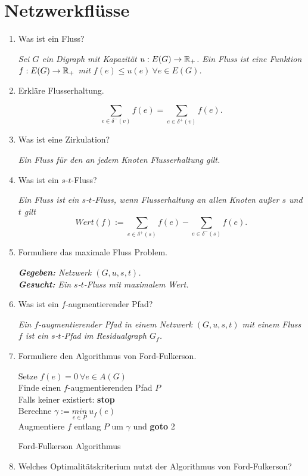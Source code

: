 \documentclass[a4paper,10pt]{scrreprt}
\begin{document}
	\section{Netzwerkflüsse}
	\begin{enumerate}
		\item Was ist ein Fluss?
		
		\textit{Sei $G$ ein Digraph mit Kapazität $u:E(G)\to \mathbb{R}_+$. Ein Fluss ist eine Funktion $f: E(G) \to \mathbb{R}_+$ mit $f(e)\le u(e)~\forall e\in E(G)$.}
		\item Erkläre Flusserhaltung.
		
		\textit{ \[\sum_{e\in \delta^-(v)} f(e) = \sum_{e\in \delta^+(v)} f(e).\]}
		\item Was ist eine Zirkulation?
		
		\textit{Ein Fluss für den an jedem Knoten Flusserhaltung gilt.}
		\item Was ist ein $s$-$t$-Fluss?
		
		\textit{Ein Fluss ist ein $s$-$t$-Fluss, wenn Flusserhaltung an allen Knoten außer $s$ und $t$ gilt
			\[Wert(f) :=\sum_{e\in \delta^+(s)} f(e) - \sum_{e\in \delta^-(s)} f(e).\]}
		\item Formuliere das maximale Fluss Problem.
		
		\textit{\hspace*{10pt}\textbf{Gegeben: }Netzwerk $(G, u, s, t)$.\\[5pt]
			\hspace*{10pt}\textbf{Gesucht: }Ein $s$-$t$-Fluss mit maximalem Wert.}
		\item Was ist ein $f$-augmentierender Pfad?
		
		\textit{Ein $f$-augmentierender Pfad in einem Netzwerk $(G, u, s, t)$ mit einem Fluss $f$ ist ein $s$-$t$-Pfad im Residualgraph $G_f$.}
		\item Formuliere den Algorithmus von Ford-Fulkerson.
		\begin{algorithm}
			\vspace*{5pt}
			Setze $f(e)=0~\forall e\in A(G)$\\
			Finde einen $f$-augmentierenden Pfad $P$\\
			\hspace*{15pt}Falls keiner existiert: \textbf{stop} \\
			Berechne $\gamma := \underset{e\in P}{min}~ u_f(e)$\\
			\hspace*{15pt}Augmentiere $f$ entlang $P$ um $\gamma$ und \textbf{goto} 2
			\caption{Ford-Fulkerson Algorithmus}
		\end{algorithm}
		\item Welches Optimalitätskriterium nutzt der Algorithmus von Ford-Fulkerson?
		

\end{enumerate}
\end{document}
